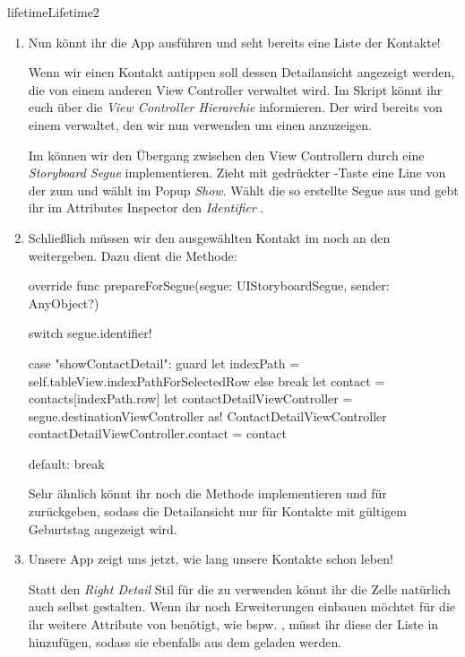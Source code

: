 \documentclass[parskip=half, final]{scrreprt}
\begin{document}
\begin{lecture}
\begin{exc}
\begin{excitem}{lifetime}{Lifetime}{2}
\begin{enumerate}
\item Nun könnt ihr die App ausführen und seht bereits eine Liste der Kontakte!

\mvcindicatorcontroller Wenn wir einen Kontakt antippen soll dessen Detailansicht angezeigt werden, die von einem anderen View Controller verwaltet wird. Im Skript könnt ihr euch über die \emph{View Controller Hierarchie} informieren. Der  wird bereits von einem  verwaltet, den wir nun verwenden um einen  anzuzeigen.

Im  können wir den Übergang zwischen den View Controllern durch eine \emph{Storyboard Segue} implementieren. Zieht mit gedrückter \keys{\ctrl}-Taste eine Line von der  zum  und wählt im Popup \emph{Show}. Wählt die so erstellte Segue aus und gebt ihr im Attributes Inspector den \emph{Identifier} .

\item Schließlich müssen wir den ausgewählten Kontakt im  noch an den  weitergeben. Dazu dient die  Methode:
\begin{swiftcode}
    override func prepareForSegue(segue: UIStoryboardSegue, sender: AnyObject?) {
        switch segue.identifier! {

        case "showContactDetail":
            guard let indexPath = self.tableView.indexPathForSelectedRow else { break }
            let contact = contacts[indexPath.row]
            let contactDetailViewController = segue.destinationViewController as! ContactDetailViewController
            contactDetailViewController.contact = contact
            
        default:
            break
        }
    }
\end{swiftcode}

Sehr ähnlich könnt ihr noch die  Methode implementieren und für   zurückgeben, sodass die Detailansicht nur für Kontakte mit gültigem Geburtstag angezeigt wird.

\item Unsere App zeigt uns jetzt, wie lang unsere Kontakte schon leben!

Statt den \emph{Right Detail} Stil für die  zu verwenden könnt ihr die Zelle natürlich auch selbst gestalten. Wenn ihr noch Erweiterungen einbauen möchtet für die ihr weitere Attribute von  benötigt, wie bspw. , müsst ihr diese der Liste  in  hinzufügen, sodass sie ebenfalls aus dem  geladen werden.


\end{enumerate}
\end{excitem}
\end{exc}
\end{lecture}
\end{document}
